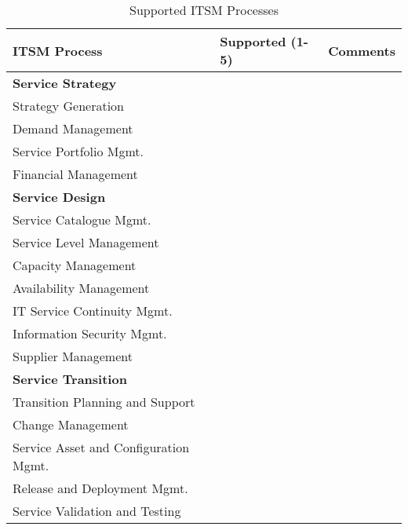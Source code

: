\begin{table}[h!]
\caption{Supported ITSM Processes}
\vspace*{0.3cm}
\begin{tabular}{|p{6.1cm}|p{4.5cm}|p{4.5cm}|}\hline
\textbf{ITSM Process}             &\textbf{Supported (1-5)}        &\textbf{Comments}\\\hline\hline
\textbf{Service Strategy}          &                                &\\
Strategy Generation            &                                &\\
Demand Management                   &                                &\\
Service Portfolio Mgmt.                   &                                &\\
Financial Management                   &                                &\\\hline
\textbf{Service Design}          &                                &\\
Service Catalogue Mgmt.                   &                                &\\
Service Level Management                   &                                &\\
Capacity Management                   &                                &\\
Availability Management                   &                                &\\
IT Service Continuity Mgmt.                   &                                &\\
Information Security Mgmt.                   &                                &\\
Supplier Management                   &                                &\\\hline
\textbf{Service Transition}          &                                &\\
Transition Planning and Support                   &                                &\\
Change Management                   &                                &\\
Service Asset and Configuration Mgmt.                   &                                &\\
Release and Deployment Mgmt.                   &                                &\\
Service Validation and Testing                   &                                &\\

\end{tabular}
\end{table}
